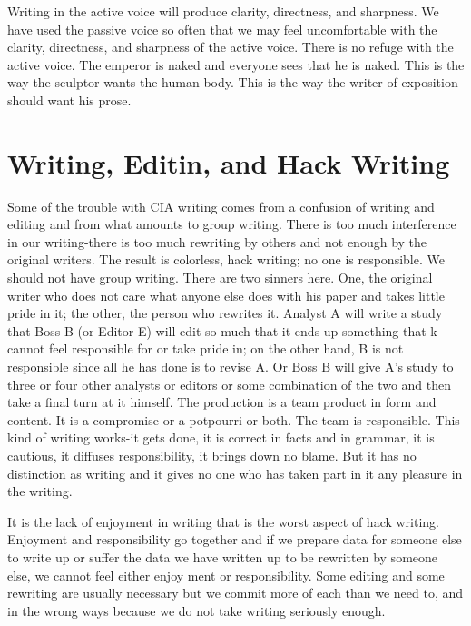 \documentclass[
    oneside,
    11pt,
]{memoir}
\begin{document}
Writing in the active voice will produce clarity, directness, and sharpness. We have used the passive voice so often that we may feel uncomfortable with the clarity, directness, and sharpness of the active voice. There is no refuge with the active voice. The emperor is naked and everyone sees that he is naked. This is the way the sculptor wants the human body. This is the way the writer of exposition should want his prose.

\chapter{Writing, Editin, and Hack Writing}

Some of the trouble with CIA writing comes from a confusion of writing and editing and from what amounts to group writing. There is too much interference in our writing-there is too much rewriting by others and not enough by the original writers. The result is colorless, hack writing; no one is responsible. We should not have group writing. There are two sinners here. One, the original writer who does not care what anyone else does with his paper and takes little pride in it; the other, the person who rewrites it. Analyst A will write a study that Boss B (or Editor E) will edit so much that it ends up something that k cannot feel responsible for or take pride in; on the other hand, B is not responsible since all he has done is to revise A. Or Boss B will give A's study to three or four other analysts or editors or some combination of the two and then take a final turn at it himself. The production is a team product in form and content. It is a compromise or a potpourri or both. The team is responsible. This kind of writing works-it gets done, it is correct in facts and in grammar, it is cautious, it diffuses responsibility, it brings down no blame. But it has no distinction as writing and it gives no one who has taken part in it any pleasure in the writing. 

It is the lack of enjoyment in writing that is the worst aspect of hack writing. Enjoyment and responsibility go together and if we prepare data for someone else to write up or suffer the data we have written up to be rewritten by someone else, we cannot feel either enjoy ment or responsibility. Some editing and some rewriting are usually necessary but we commit more of each than we need to, and in the wrong ways because we do not take writing seriously enough. 
\end{document}
